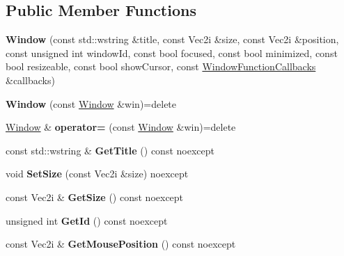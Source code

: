 \subsection*{Public Member Functions}
\begin{DoxyCompactItemize}
\item 
\mbox{\label{class_blade_1_1_window_a368b4508f6adc041e409d124daf9b401}} 
{\bfseries Window} (const std\+::wstring \&title, const Vec2i \&size, const Vec2i \&position, const unsigned int window\+Id, const bool focused, const bool minimized, const bool resizeable, const bool show\+Cursor, const \hyperlink{struct_blade_1_1_window_function_callbacks}{Window\+Function\+Callbacks} \&callbacks)
\item 
\mbox{\label{class_blade_1_1_window_a5fbc0563ad70c90dea8c89394370b59f}} 
{\bfseries Window} (const \hyperlink{class_blade_1_1_window}{Window} \&win)=delete
\item 
\mbox{\label{class_blade_1_1_window_a4f02bdb5ddedf61aa803640e96e6e061}} 
\hyperlink{class_blade_1_1_window}{Window} \& {\bfseries operator=} (const \hyperlink{class_blade_1_1_window}{Window} \&win)=delete
\item 
\mbox{\label{class_blade_1_1_window_a9e93304e7d1c502777b8e52589f763b9}} 
const std\+::wstring \& {\bfseries Get\+Title} () const noexcept
\item 
\mbox{\label{class_blade_1_1_window_a4d41b1bd3327d7016f21d76fc7a447f7}} 
void {\bfseries Set\+Size} (const Vec2i \&size) noexcept
\item 
\mbox{\label{class_blade_1_1_window_adcce507fbead95a8e64bd1c7c7875178}} 
const Vec2i \& {\bfseries Get\+Size} () const noexcept
\item 
\mbox{\label{class_blade_1_1_window_a88878f731417504f8838bfd89a34ce6a}} 
unsigned int {\bfseries Get\+Id} () const noexcept
\item 
\mbox{\label{class_blade_1_1_window_a2abe948b1766670f72d6cfdf9c21162d}} 
const Vec2i \& {\bfseries Get\+Mouse\+Position} () const noexcept

\end{DoxyCompactItemize}
